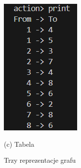 \documentclass{article}
\begin{document}
\begin{figure}[htbp]
\begin{minipage}[b]{0.3\textwidth}
			\includegraphics[width=\textwidth]{reprezentacja_table_k.png}
			\par\small (c) Tabela
		\end{minipage}
		\caption{Trzy reprezentacje grafu}
		\label{fig:trzy-obrazki}
	\end{figure}
	
\end{document}
